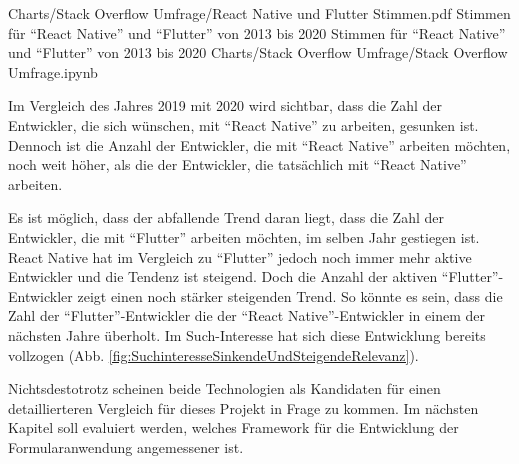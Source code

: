 \begin{alexfigurewithnotebook}{Charts/Stack Overflow Umfrage/React Native und Flutter Stimmen.pdf}
	{Stimmen für \enquote{React Native} und \enquote{Flutter} von 2013 bis 2020}
	{Stimmen für \enquote{React Native} und \enquote{Flutter} von 2013 bis 2020}
	{Charts/Stack Overflow Umfrage/Stack Overflow Umfrage.ipynb}
	{}
	\label{fig:ReactNativeUndFlutterStimmen}

\end{alexfigurewithnotebook}

Im Vergleich des Jahres 2019 mit 2020 wird sichtbar, dass die Zahl der Entwickler, die sich wünschen, mit \enquote{React Native} zu arbeiten, gesunken ist.
Dennoch ist die Anzahl der Entwickler, die mit \enquote{React Native} arbeiten möchten, noch weit höher, als die der Entwickler, die tatsächlich mit \enquote{React Native} arbeiten.

Es ist möglich, dass der abfallende Trend daran liegt, dass die Zahl der Entwickler, die mit \enquote{Flutter} arbeiten möchten, im selben Jahr gestiegen ist.
React Native hat im Vergleich zu \enquote{Flutter} jedoch noch immer mehr aktive Entwickler und die Tendenz ist steigend.
Doch die Anzahl der aktiven \enquote{Flutter}-Entwickler zeigt einen noch stärker steigenden Trend.
So könnte es sein, dass die Zahl der \enquote{Flutter}-Entwickler die der \enquote{React Native}-Entwickler in einem der nächsten Jahre überholt.
Im Such-Interesse hat sich diese Entwicklung bereits vollzogen (Abb. \ref{fig:SuchinteresseSinkendeUndSteigendeRelevanz}). 

Nichtsdestotrotz scheinen beide Technologien als Kandidaten für einen detaillierteren Vergleich für dieses Projekt in Frage zu kommen.
Im nächsten Kapitel soll evaluiert werden, welches Framework für die Entwicklung der Formularanwendung angemessener ist.



